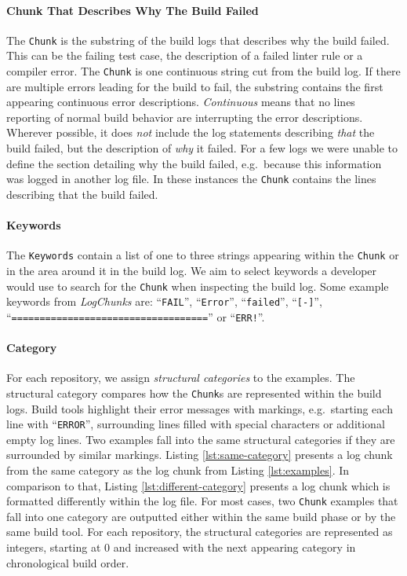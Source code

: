 \documentclass[\myrootdir/main.tex]{subfiles}
\begin{document}
\paragraph{Chunk That Describes Why The Build Failed}
The \texttt{Chunk} is the substring of the build logs that describes why the build failed.
This can be the failing test case, the description of a failed linter rule or a compiler error.
The \texttt{Chunk} is one continuous string cut from the build log.
If there are multiple errors leading for the build to fail, the substring contains the first appearing continuous error descriptions.
\emph{Continuous} means that no lines reporting of normal build behavior are interrupting the error descriptions.
Wherever possible, it does \emph{not} include the log statements describing \emph{that} the build failed, but the description of \emph{why} it failed.
For a few logs we were unable to define the section detailing why the build failed, e.g.\ because this information was logged in another log file.
In these instances the \texttt{Chunk} contains the lines describing that the build failed.

\paragraph{Keywords}
The \texttt{Keywords} contain a list of one to three strings appearing within the \texttt{Chunk} or in the area around it in the build log.
We aim to select keywords a developer would use to search for the \texttt{Chunk} when inspecting the build log.
Some example keywords from \emph{LogChunks} are: ``\texttt{FAIL}'', ``\texttt{Error}'', ``\texttt{failed}'', ``\texttt{[-]}'', ``\texttt{===================================}'' or ``\texttt{ERR!}''.

\paragraph{Category}
For each repository, we assign \emph{structural categories} to the examples.
The structural category compares how the \texttt{Chunk}s are represented within the build logs.
Build tools highlight their error messages with markings, e.g.\ starting each line with ``\texttt{ERROR}'', surrounding lines filled with special characters or additional empty log lines.
Two examples fall into the same structural categories if they are surrounded by similar markings.
Listing \ref{lst:same-category} presents a log chunk from the same category as the log chunk from Listing \ref{lst:examples}.
In comparison to that, Listing \ref{lst:different-category} presents a log chunk which is formatted differently within the log file.
For most cases, two \texttt{Chunk} examples that fall into one category are outputted either within the same build phase or by the same build tool.
For each repository, the structural categories are represented as integers, starting at 0 and increased with the next appearing category in chronological build order.
\end{document}
